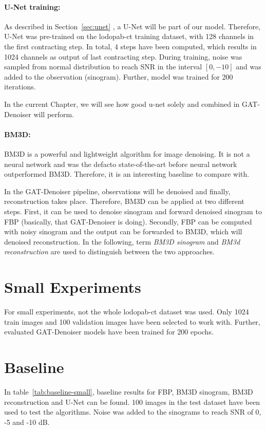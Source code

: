 \paragraph{U-Net training:}
As described in Section~\ref{sec:unet} \textit{}, a U-Net will be part of our model.
Therefore, U-Net was pre-trained on the lodopab-ct training dataset, with 128 channels in the first contracting step. 
In total, 4 steps have been computed, which results in 1024 channels as output of last contracting step.
During training, noise was sampled from normal distribution to reach SNR in the interval $[0, -10]$ and was added to the observation (sinogram). 
Further, model was trained for 200 iterations.

In the current Chapter, we will see how good u-net solely and combined in GAT-Denoiser will perform.

\paragraph{BM3D:}
BM3D is a powerful and lightweight algorithm for image denoising. 
It is not a neural network and was the defacto state-of-the-art before neural network outperformed
BM3D. Therefore, it is an interesting baseline to compare with.

In the GAT-Denoiser pipeline, observations will be denoised and finally, reconstruction takes place.
Therefore, BM3D can be applied at two different steps. First, it can be used to denoise sinogram
and forward denoised sinogram to FBP (basically, that GAT-Denoiser is doing). Secondly, FBP can be
computed with noisy sinogram and the output can be forwarded to BM3D, which will denoised reconstruction.
In the following, term \textit{BM3D sinogram} and \textit{BM3d reconstruction} 
are used to distinguish between the two approaches.


\section{Small Experiments}
For small experiments, not the whole lodopab-ct dataset was used. Only 1024 train images
and 100 validation images have been selected to work with. 
Further, evaluated GAT-Denoiser models have been trained for 200 epochs.

\section{Baseline}

In table~\ref{tab:baseline-small}, baseline results for FBP, BM3D sinogram, BM3D reconstruction and U-Net can be found.
100 images in the test dataset have been used to test the algorithms. Noise was added to the sinograms to reach SNR of 0, -5 and -10 dB.

